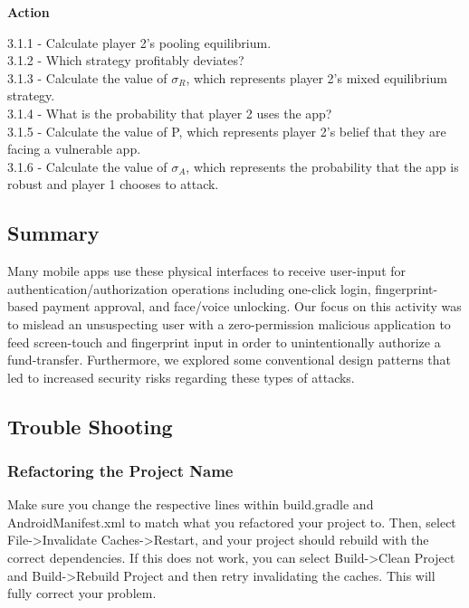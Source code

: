 \documentclass[letterpaper,12pt]{report}
\begin{document}
\begin{mdframed}[backgroundcolor=blue!10,style=code,nobreak=true,align=center,userdefinedwidth=14cm]

\textbf{Action}
\bigskip

3.1.1 - Calculate player 2's pooling equilibrium.\\
3.1.2 - Which strategy profitably deviates?\\
3.1.3 - Calculate the value of $\sigma_R$, which represents player 2's mixed equilibrium strategy.\\
3.1.4 - What is the probability that player 2 uses the app?\\
3.1.5 - Calculate the value of P, which represents player 2's belief that they are facing a vulnerable app.\\
3.1.6 - Calculate the value of $\sigma_A$, which represents the probability that the app is robust and player 1 chooses to attack.
\end{mdframed}

\subsection*{Summary}\label{sec:Summary-MS}

Many mobile apps use these physical interfaces to receive user-input for authentication/authorization operations including one-click login, fingerprint-based payment approval, and face/voice unlocking. Our focus on this activity was to mislead an unsuspecting user with a zero-permission malicious application to feed screen-touch and fingerprint input in order to unintentionally authorize a fund-transfer. Furthermore, we explored some conventional design patterns that led to increased security risks regarding these types of attacks.

\subsection*{Trouble Shooting}\label{sec:Trouble Shooting}
    
\subsubsection*{Refactoring the Project Name}

Make sure you change the respective lines within build.gradle and AndroidManifest.xml to match what you refactored your project to. Then, select File->Invalidate Caches->Restart, and your project should rebuild with the correct dependencies. If this does not work, you can select Build->Clean Project and Build->Rebuild Project and then retry invalidating the caches. This will fully correct your problem.
\end{document}
